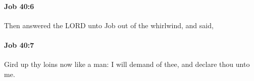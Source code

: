 		\paragraph{Job 40:6} %
			\label{JOB-40-6}

			Then answered the LORD unto Job out of the whirlwind, and said,


		\paragraph{Job 40:7} %
			\label{JOB-40-7}

			Gird up thy loins now like a man: I will demand of thee, and declare thou unto me.


